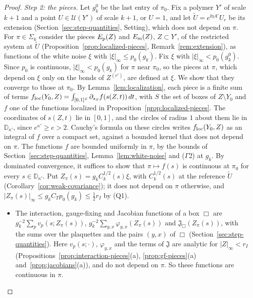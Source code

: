 \begin{proof}
\emph{Step 2: the pieces.} Let $g^0_k$ be the last entry of $\pi_0$. Fix a polymer $Y'$ of scale $k+1$ and a point $U\in\mathcal U(Y')$ of scale $k+1$, or $U=1$, and let $\tilde U=e^{\ii\eta A'}U_r$ be its extension (Section~\ref{sec:step-quantities}, Setting), which does not depend on $\pi$. For $\pi\in\Sigma_k$ consider the pieces $E_{\rm p}(Z)$ and $E_{\rm m}(Z)$, $Z\subset Y'$, of the restricted system at $\tilde U$ (Proposition~\ref{prop:localized-pieces}, Remark~\ref{rem:extension}), as functions of the white noise $\xi$ with $|\xi|_\infty\le p_0(g_k)$. Fix $\xi$ with $|\xi|_\infty<p_0(g^0_k)$. Since $p_0$ is continuous, $|\xi|_\infty<p_0(g_k)$ for $\pi$ near $\pi_0$, so the pieces at $\pi$, which depend on $\xi$ only on the bonds of $Z^{(r')}$, are defined at $\xi$. We show that they converge to those at $\pi_0$. By Lemma~\ref{lem:localization}, each piece is a finite sum of terms $f_{\rm loc}(Y_0,Z)=\int_{[0,1]^S}\partial_{s_S}f(s(Z,t))\,dt$, with $S$ the set of boxes of $Z\setminus Y_0$ and $f$ one of the functions localized in Proposition~\ref{prop:localized-pieces}. The coordinates of $s(Z,t)$ lie in $[0,1]$, and the circles of radius $1$ about them lie in $\mathbb D_{\kappa'}$, since $e^{\kappa'}\ge e>2$. Cauchy's formula on these circles writes $f_{\rm loc}(Y_0,Z)$ as an integral of $f$ over a compact set, against a bounded kernel that does not depend on $\pi$. The functions $f$ are bounded uniformly in $\pi$, by the bounds of Section~\ref{sec:step-quantities}, Lemma~\ref{lem:white-noise} and ($\Gamma$2) at $g_k$. By dominated convergence, it suffices to show that $\pi\mapsto f(s)$ is continuous at $\pi_0$ for every $s\in\mathbb D_{\kappa'}$. Put $Z_\pi(s)=g_kC_k^{1/2}(s)\xi$, with $C_k^{1/2}(s)$ at the reference $\tilde U$ (Corollary~\ref{cor:weak-covariance}); it does not depend on $\pi$ otherwise, and $|Z_\pi(s)|_\infty\le g_kC_Tp_0(g_k)\le\frac12r_I$ by (Q1).
\begin{itemize}
\item The interaction, gauge-fixing and Jacobian functions of a box $\Box$ are $g_k^{-2}\sum_pv_p(s;Z_\pi(s))$, $g_k^{-2}\sum_{y,x}\varphi_{y,x}(Z_\pi(s))$ and $\mathfrak J_\Box(Z_\pi(s))$, with the sums over the plaquettes and the pairs $(y,x)$ of $\Box$ (Section~\ref{sec:step-quantities}). Here $v_p(s;\cdot)$, $\varphi_{y,x}$ and the terms of $\mathfrak J$ are analytic for $|Z|_\infty<r_I$ (Propositions~\ref{prop:interaction-pieces}(a), \ref{prop:gf-pieces}(a) and~\ref{prop:jacobians}(a)), and do not depend on $\pi$. So these functions are continuous in $\pi$.

\end{itemize}
\end{proof}
